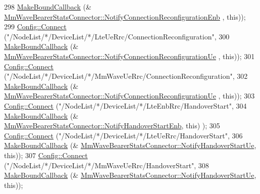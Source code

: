 \begin{DoxyCode}
298                        \hyperlink{group__makeboundcallback_ga1725d6362e6065faa0709f7c93f8d770}{MakeBoundCallback} (&
      \hyperlink{classns3_1_1MmWaveBearerStatsConnector_a49dcac6336320ee6ddb5da902c4b4dec}{MmWaveBearerStatsConnector::NotifyConnectionReconfigurationEnb}
      , \textcolor{keyword}{this}));
299       \hyperlink{group__config_ga4014f151241cd0939b6cb64409605736}{Config::Connect} (\textcolor{stringliteral}{"/NodeList/*/DeviceList/*/LteUeRrc/ConnectionReconfiguration"},
300                        \hyperlink{group__makeboundcallback_ga1725d6362e6065faa0709f7c93f8d770}{MakeBoundCallback} (&
      \hyperlink{classns3_1_1MmWaveBearerStatsConnector_aca34f8d00bf86a9974663c869573e6af}{MmWaveBearerStatsConnector::NotifyConnectionReconfigurationUe}
      , \textcolor{keyword}{this}));
301       \hyperlink{group__config_ga4014f151241cd0939b6cb64409605736}{Config::Connect} (\textcolor{stringliteral}{"/NodeList/*/DeviceList/*/MmWaveUeRrc/ConnectionReconfiguration"},
302            \hyperlink{group__makeboundcallback_ga1725d6362e6065faa0709f7c93f8d770}{MakeBoundCallback} (&
      \hyperlink{classns3_1_1MmWaveBearerStatsConnector_aca34f8d00bf86a9974663c869573e6af}{MmWaveBearerStatsConnector::NotifyConnectionReconfigurationUe}
      , \textcolor{keyword}{this}));
303       \hyperlink{group__config_ga4014f151241cd0939b6cb64409605736}{Config::Connect} (\textcolor{stringliteral}{"/NodeList/*/DeviceList/*/LteEnbRrc/HandoverStart"},
304                        \hyperlink{group__makeboundcallback_ga1725d6362e6065faa0709f7c93f8d770}{MakeBoundCallback} (&
      \hyperlink{classns3_1_1MmWaveBearerStatsConnector_a46ff74e05696af0f69e1ea0458f71dcc}{MmWaveBearerStatsConnector::NotifyHandoverStartEnb}, \textcolor{keyword}{this})
      );
305       \hyperlink{group__config_ga4014f151241cd0939b6cb64409605736}{Config::Connect} (\textcolor{stringliteral}{"/NodeList/*/DeviceList/*/LteUeRrc/HandoverStart"},
306                        \hyperlink{group__makeboundcallback_ga1725d6362e6065faa0709f7c93f8d770}{MakeBoundCallback} (&
      \hyperlink{classns3_1_1MmWaveBearerStatsConnector_a256d437bf2591e6bd5a1b544969fd6f9}{MmWaveBearerStatsConnector::NotifyHandoverStartUe}, \textcolor{keyword}{this}));
307       \hyperlink{group__config_ga4014f151241cd0939b6cb64409605736}{Config::Connect} (\textcolor{stringliteral}{"/NodeList/*/DeviceList/*/MmWaveUeRrc/HandoverStart"},
308            \hyperlink{group__makeboundcallback_ga1725d6362e6065faa0709f7c93f8d770}{MakeBoundCallback} (&
      \hyperlink{classns3_1_1MmWaveBearerStatsConnector_a256d437bf2591e6bd5a1b544969fd6f9}{MmWaveBearerStatsConnector::NotifyHandoverStartUe}, \textcolor{keyword}{this}));

\end{DoxyCode}
